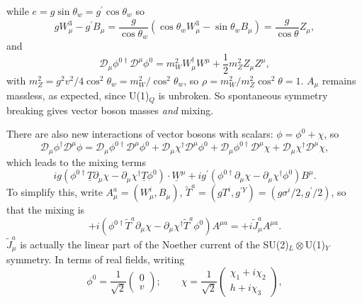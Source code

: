 \documentclass[a4paper,12pt]{article}
\begin{document}
while $e = g \sin\theta_w = g^\prime \cos\theta_w$ so 
\begin{equation}
g W_\mu^3 - g^\prime B_\mu = \frac{g}{\cos \theta_w} (\cos\theta_w W_\mu^3 - \sin\theta_w B_\mu) = \frac{g}{\cos\theta} Z_\mu,
\end{equation}
and
\begin{equation}
\mathcal{D}_\mu \phi^{0 \dagger} \mathcal{D}^\mu \phi^0 = m_W^2 W_\mu^\dagger W^\mu + \frac{1}{2}m_Z^2 Z_\mu Z^\mu,
\end{equation}
with $m_Z^2 = g^2v^2/4\cos^2\theta_w = m_W^2/\cos^2\theta_w$, so $\rho = m_W^2/m_Z^2\cos^2\theta = 1$. $A_\mu$ remains massless, as expected, since U(1)$_Q$ is unbroken. So spontaneous symmetry breaking gives vector boson masses \textit{and} mixing.

There are also new interactions of vector bosons with scalars: $\phi = \phi^0 + \chi$, so
\begin{equation}
\mathcal{D}_\mu \phi^{\dagger} \mathcal{D}^\mu \phi = \mathcal{D}_\mu \phi^{0 \dagger} \mathcal{D}^\mu \phi^0 + \mathcal{D}_\mu \chi^{\dagger} \mathcal{D}^\mu \phi^0 + \mathcal{D}_\mu \phi^{0 \dagger} \mathcal{D}^\mu \chi + \mathcal{D}_\mu \chi^{\dagger} \mathcal{D}^\mu \chi,
\end{equation}
which leads to the mixing terms
\begin{equation}
ig(\phi^{0 \dagger} \underline{T} \partial_\mu \chi -\partial_\mu \chi^\dagger \underline{T} \phi^0) \cdot \underline{W}^\mu + i g^\prime (\phi^{0 \dagger} \partial_\mu \chi - \partial_\mu \chi^\dagger \phi^0) B^\mu.
\end{equation}
To simplify this, write $A_\mu^a = (W_\mu^i, B_\mu)$, $\tilde{T}^a = (gT^i, g^{\prime Y}) = (g\sigma^i/2, g^\prime/2)$, so that the mixing is
\begin{equation}
+i(\phi^{0 \dagger} \tilde{T}^a \partial_\mu \chi - \partial_\mu \chi^\dagger \tilde{T}^a \phi^0)A^{\mu a} = +i \tilde{J}_\mu^a A^{\mu a}.
\end{equation}
$\tilde{J}_\mu^a$ is actually the linear part of the Noether current of the SU(2)$_L \otimes$U(1)$_Y$ symmetry. In terms of real fields, writing 
\[\phi^0 = \frac{1}{\sqrt{2}} \left( \begin{array}{cc}
0 \\
v
\end{array} \right); \qquad
\chi = \frac{1}{\sqrt{2}}
 \left( \begin{array}{cc}
\chi_1 + i \chi_2 \\
h + i \chi_3  \end{array} \right), \]
\end{document}
